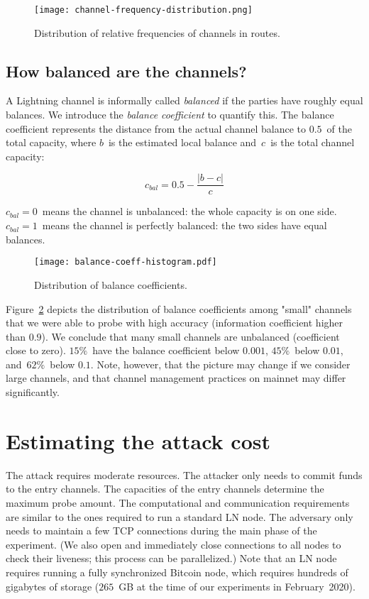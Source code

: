 \begin{figure}[h]
	\centering
	\texttt{[image: channel-frequency-distribution.png]}
	\caption{Distribution of relative frequencies of channels in routes.}
	\label{fig:channel-frequency-distribution}
\end{figure}


\subsection{How balanced are the channels?}

A Lightning channel is informally called \textit{balanced} if the parties have roughly equal balances.
We introduce the \textit{balance coefficient} to quantify this.
The balance coefficient represents the distance from the actual channel balance to $0.5$~of the total capacity, where $b$~is the estimated local balance and~$c$~is the total channel capacity:

\[c_{bal} = 0.5 - \frac{|b-c|}{c} \]

$c_{bal} = 0$~means the channel is unbalanced: the whole capacity is on one side.
$c_{bal} = 1$~means the channel is perfectly balanced: the two sides have equal balances.

\begin{figure}[h]
	\centering
	\texttt{[image: balance-coeff-histogram.pdf]}
	\caption{Distribution of balance coefficients.}
	\label{fig:balance-coeff-histogram}
\end{figure}

Figure~\ref{fig:balance-coeff-histogram} depicts the distribution of balance coefficients among "small" channels that we were able to probe with high accuracy (information coefficient higher than $0.9$).
We conclude that many small channels are unbalanced (coefficient close to zero).
$15\%$~have the balance coefficient below $0.001$, $45\%$~below $0.01$, and~$62\%$~below $0.1$.
Note, however, that the picture may change if we consider large channels, and that channel management practices on mainnet may differ significantly.


\section{Estimating the attack cost}

The attack requires moderate resources.
The attacker only needs to commit funds to the entry channels.
The capacities of the entry channels determine the maximum probe amount.
The computational and communication requirements are similar to the ones required to run a standard LN node.
The adversary only needs to maintain a few TCP connections during the main phase of the experiment.
(We also open and immediately close connections to all nodes to check their liveness; this process can be parallelized.)
Note that an LN node requires running a fully synchronized Bitcoin node, which requires hundreds of gigabytes of storage ($265$~GB at the time of our experiments in February~2020).

